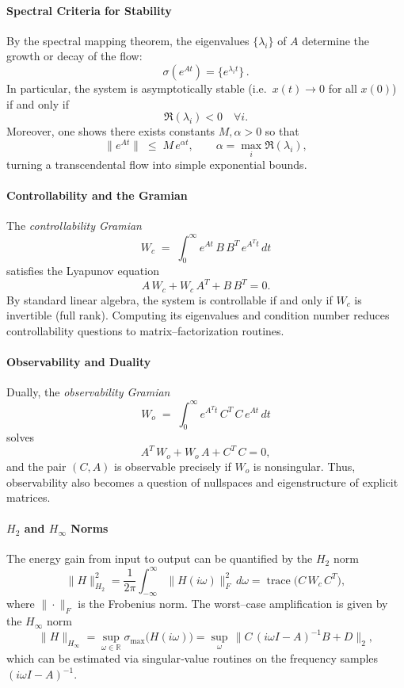 \paragraph{Spectral Criteria for Stability}  
By the spectral mapping theorem, the eigenvalues \(\{\lambda_i\}\) of \(A\) determine the growth or decay of the flow:
\[
\sigma(e^{At}) = \{e^{\lambda_i t}\}\,.
\]
In particular, the system is asymptotically stable (i.e.\ \(x(t)\to0\) for all \(x(0)\)) if and only if
\[
\Re(\lambda_i)<0\quad\forall i.
\]
Moreover, one shows there exists constants \(M,\alpha>0\) so that
\[
\|e^{At}\|\;\le\;M\,e^{\alpha t},\qquad
\alpha = \max_i \Re(\lambda_i),
\]
turning a transcendental flow into simple exponential bounds.

\paragraph{Controllability and the Gramian}  
The \emph{controllability Gramian}
\[
W_c \;=\;\int_{0}^{\infty} e^{At}\,B\,B^{T}\,e^{A^{T}t}\,dt
\]
satisfies the Lyapunov equation
\[
A\,W_c + W_c\,A^T + B\,B^T = 0.
\]
By standard linear algebra, the system is controllable if and only if \(W_c\) is invertible (full rank).  Computing its eigenvalues and condition number reduces controllability questions to matrix–factorization routines.

\paragraph{Observability and Duality}  
Dually, the \emph{observability Gramian}
\[
W_o \;=\;\int_{0}^{\infty} e^{A^{T}t}\,C^T\,C\,e^{At}\,dt
\]
solves
\[
A^T\,W_o + W_o\,A + C^T\,C = 0,
\]
and the pair \((C,A)\) is observable precisely if \(W_o\) is nonsingular.  Thus, observability also becomes a question of nullspaces and eigenstructure of explicit matrices.

\paragraph{\(H_{2}\) and \(H_{\infty}\) Norms}  
The energy gain from input to output can be quantified by the \(H_2\) norm
\[
\|H\|_{H_2}^2
= \frac{1}{2\pi}\int_{-\infty}^{\infty}\!\!\|H(i\omega)\|_F^2\,d\omega
=\operatorname{trace}\bigl(C\,W_c\,C^T\bigr),
\]
where \(\|\cdot\|_F\) is the Frobenius norm.  The worst–case amplification is given by the \(H_\infty\) norm
\[
\|H\|_{H_\infty}
= \sup_{\omega\in\mathbb R}\sigma_{\max}\bigl(H(i\omega)\bigr)
=\sup_{\omega}\,\bigl\|C\,(i\omega I - A)^{-1}B + D\bigr\|_{2},
\]
which can be estimated via singular‐value routines on the frequency samples \((i\omega I - A)^{-1}\).

